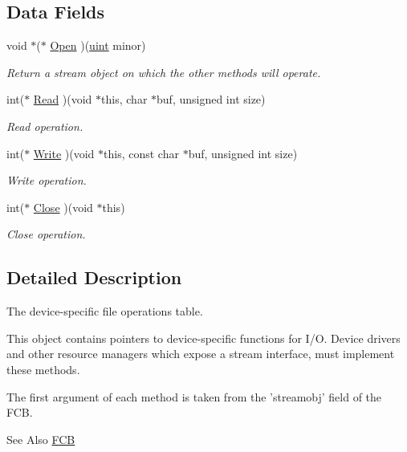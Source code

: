\subsection*{Data Fields}
\begin{DoxyCompactItemize}
\item 
void $\ast$($\ast$ \hyperlink{structfile__operations_ac7cc611291834295b031874383bf3ec6}{Open} )(\hyperlink{bios_8h_a91ad9478d81a7aaf2593e8d9c3d06a14}{uint} minor)
\begin{DoxyCompactList}\small\item\em Return a stream object on which the other methods will operate. \end{DoxyCompactList}\item 
int($\ast$ \hyperlink{structfile__operations_aaec42e751424378bb7fc1ad14c701819}{Read} )(void $\ast$this, char $\ast$buf, unsigned int size)
\begin{DoxyCompactList}\small\item\em Read operation. \end{DoxyCompactList}\item 
int($\ast$ \hyperlink{structfile__operations_a18e4e521277501fe34c95a3e2a4ef4d5}{Write} )(void $\ast$this, const char $\ast$buf, unsigned int size)
\begin{DoxyCompactList}\small\item\em Write operation. \end{DoxyCompactList}\item 
int($\ast$ \hyperlink{structfile__operations_ae11b010a002957a34b54220a67919ea3}{Close} )(void $\ast$this)
\begin{DoxyCompactList}\small\item\em Close operation. \end{DoxyCompactList}\end{DoxyCompactItemize}


\subsection{Detailed Description}
The device-\/specific file operations table. 

This object contains pointers to device-\/specific functions for I/\-O. Device drivers and other resource managers which expose a stream interface, must implement these methods.

The first argument of each method is taken from the 'streamobj' field of the F\-C\-B. \begin{DoxySeeAlso}{See Also}
\hyperlink{group__rlists_ga60c6c294fa1d8ea73ed270404fe5c17d}{F\-C\-B} 
\end{DoxySeeAlso}


